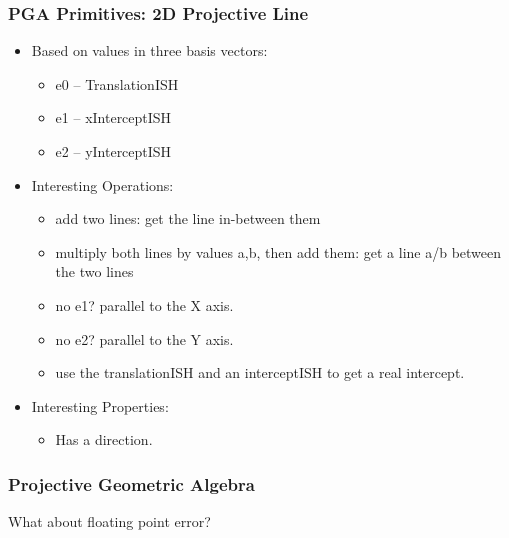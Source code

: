 \documentclass[hyperref={pdfpagemode=FullScreen},aspectratio=169]{beamer}
\begin{document}
\begin{frame}
  \frametitle{PGA Primitives: 2D Projective Line}
  \begin{itemize}
  \item Based on values in three basis vectors:
    \begin {itemize}
    \item e0 -- TranslationISH
    \item e1 -- xInterceptISH
    \item e2 -- yInterceptISH
    \end{itemize}
  \item Interesting Operations:
    \begin {itemize}
    \item add two lines: get the line in-between them
    \item multiply both lines by values a,b, then add them: get a line a/b between the two lines
    \item no e1? parallel to the X axis.
    \item no e2? parallel to the Y axis.
    \item use the translationISH and an interceptISH to get a real intercept.
    \end{itemize}
  \item Interesting Properties:
    \begin {itemize}
    \item Has a direction.
    \end{itemize}
  \end{itemize}
\end{frame}

\begin{frame}
  \frametitle{Projective Geometric Algebra}
  \Huge{\centerline{What about floating point error?}}
\end{frame}
\end{document}
